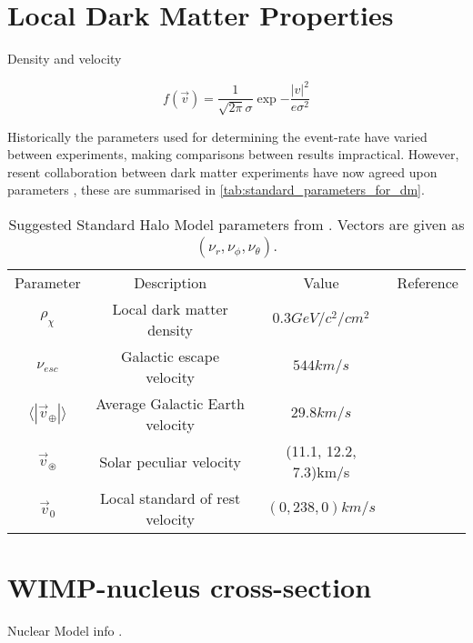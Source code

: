 \section{Local Dark Matter Properties}
\par
Density and velocity


\begin{equation}
    f(\Vec{v}) = \frac{1}{\sqrt{2\pi}\sigma} \exp{-\frac{|v|^2}{e\sigma^2}} 
\end{equation}

\par
Historically the parameters used for determining the event-rate have varied between experiments, making comparisons between results impractical.
However, resent collaboration between dark matter experiments have now agreed upon parameters \cite{standard_halo_model_conventions_ref}, these are summarised in \autoref{tab:standard_parameters_for_dm}.

\begin{table}[!htbp]
    \centering
    \begin{tabular}{c|c|c|c}
        Parameter                               & Description               & Value             & Reference \\
        $\rho_\chi$                             & Local dark matter density & $0.3GeV/c^2/cm^2$ &            \\
        $\nu_{esc}$                             & Galactic escape velocity  & $544km/s$ &            \\
        $\langle|\Vec{v}_{\oplus}|\rangle$      & Average Galactic Earth velocity & $29.8km/s$ &            \\
        $\Vec{v}_{\circledast}$ & Solar peculiar velocity & (11.1, 12.2, 7.3)km/s &            \\
        $\Vec{v}_0$ & Local standard of rest velocity & $(0,238,0)km/s$ &            
         
    \end{tabular}
    \caption{Suggested Standard Halo Model parameters from \cite{standard_halo_model_conventions_ref}. Vectors are given as $(\nu_r,\nu_\phi,\nu_\theta)$.}
    \label{tab:standard_parameters_for_dm}
\end{table}



\section{WIMP-nucleus cross-section}
\par
Nuclear Model info \cite{wimp_nuclear_model_ref}.